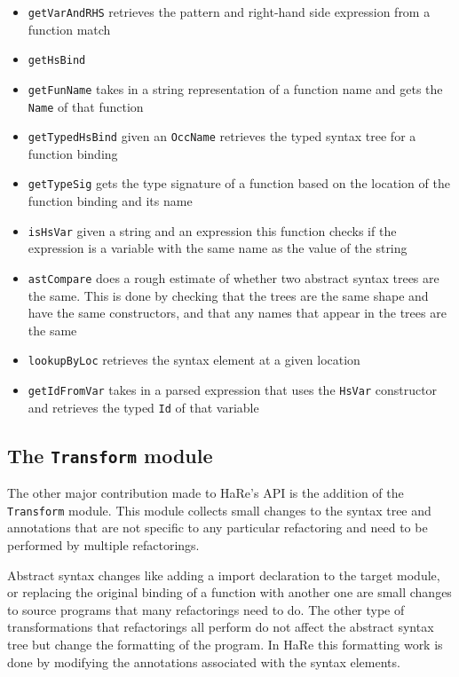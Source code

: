 \begin{itemize}
\item \texttt{getVarAndRHS} retrieves the pattern and right-hand side expression from a function match
\item \texttt{getHsBind}
\item \texttt{getFunName} takes in a string representation of a function name and gets the \texttt{Name} of that function
\item \texttt{getTypedHsBind} given an \texttt{OccName} retrieves the typed syntax tree for a function binding
\item \texttt{getTypeSig} gets the type signature of a function based on the location of the function binding and its name
\item \texttt{isHsVar} given a string and an expression this function checks if the expression is a variable with the same name as the value of the string
\item \texttt{astCompare} does a rough estimate of whether two abstract syntax trees are the same. This is done by checking that the trees are the same shape and have the same constructors, and that any names that appear in the trees are the same 
\item \texttt{lookupByLoc} retrieves the syntax element at a given location
\item \texttt{getIdFromVar} takes in a parsed expression that uses the \texttt{HsVar} constructor and retrieves the typed \texttt{Id} of that variable
\end{itemize}


\subsection{The \texttt{Transform} module}

The other major contribution made to HaRe's API is the addition of the \texttt{Transform} module. This module collects small changes to the syntax tree and annotations that are not specific to any particular refactoring and need to be performed by multiple refactorings.

Abstract syntax changes like adding a import declaration to the target module, or replacing the original binding of a function with another one are small changes to source programs that many refactorings need to do. The other type of transformations that refactorings all perform do not affect the abstract syntax tree but change the formatting of the program. In HaRe this formatting work is done by modifying the annotations associated with the syntax elements. 

